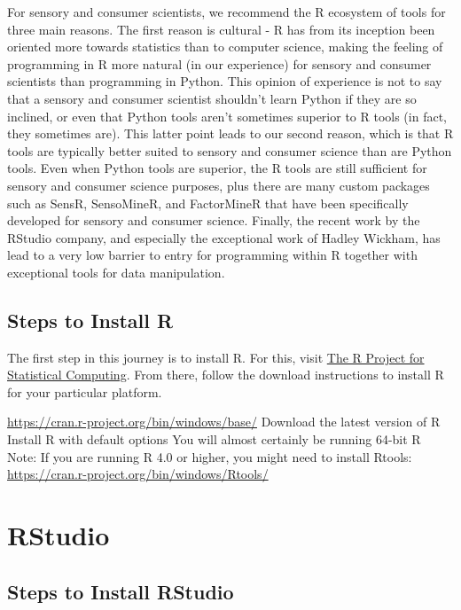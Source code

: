 \documentclass[
]{book}
\begin{document}
For sensory and consumer scientists, we recommend the R ecosystem of tools for three main reasons. The first reason is cultural - R has from its inception been oriented more towards statistics than to computer science, making the feeling of programming in R more natural (in our experience) for sensory and consumer scientists than programming in Python. This opinion of experience is not to say that a sensory and consumer scientist shouldn't learn Python if they are so inclined, or even that Python tools aren't sometimes superior to R tools (in fact, they sometimes are). This latter point leads to our second reason, which is that R tools are typically better suited to sensory and consumer science than are Python tools. Even when Python tools are superior, the R tools are still sufficient for sensory and consumer science purposes, plus there are many custom packages such as SensR, SensoMineR, and FactorMineR that have been specifically developed for sensory and consumer science. Finally, the recent work by the RStudio company, and especially the exceptional work of Hadley Wickham, has lead to a very low barrier to entry for programming within R together with exceptional tools for data manipulation.

\hypertarget{steps-to-install-r}{%
\subsection{Steps to Install R}\label{steps-to-install-r}}

The first step in this journey is to install R. For this, visit \href{https://www.r-project.org/}{The R Project for Statistical Computing}. From there, follow the download instructions to install R for your particular platform.

\url{https://cran.r-project.org/bin/windows/base/}
Download the latest version of R
Install R with default options
You will almost certainly be running 64-bit R
Note: If you are running R 4.0 or higher, you might need to install Rtools:
\url{https://cran.r-project.org/bin/windows/Rtools/}

\hypertarget{rstudio}{%
\section{RStudio}\label{rstudio}}

\hypertarget{steps-to-install-rstudio}{%
\subsection{Steps to Install RStudio}\label{steps-to-install-rstudio}}
\end{document}
